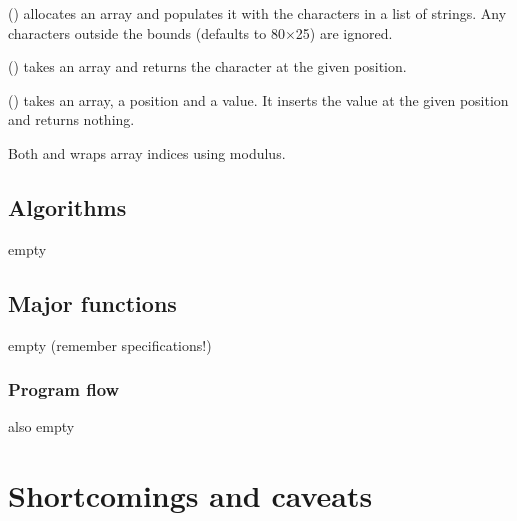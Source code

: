 \documentclass[12pt, a4paper]{article}
\begin{document}
\vspace{6pt}
\noindent
{} () allocates an array and populates it with the characters in a list of strings. Any characters outside the bounds (defaults to 80$\times$25) are ignored.

\vspace{6pt}
\noindent
{} () takes an array and returns the character at the given position.

\vspace{6pt}
\noindent
{} () takes an array, a position and a value. It inserts the value at the given position and returns nothing.

\vspace{6pt}
\noindent
Both  and  wraps array indices using modulus.

\subsection{Algorithms}
\label{sec:algorithms}

empty

\subsection{Major functions}
\label{sec:functions}

empty (remember specifications!)

\subsubsection{Program flow}
\label{sec:flow}

also empty

\section{Shortcomings and caveats}

\vfill



\end{document}
